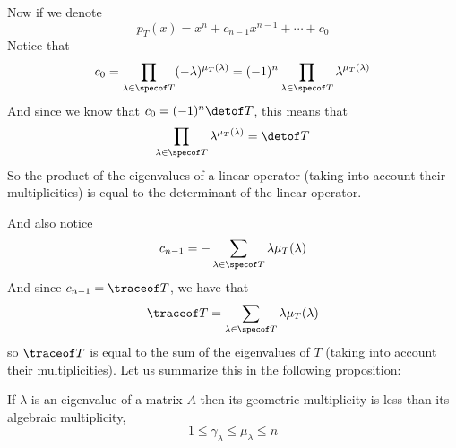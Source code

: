 Now if we denote
\[ p_T(x) = x^n + c_{n-1}x^{n-1} + \cdots + c_0 \]
Notice that
\[ c_0 = \prod_{\lambda\in\specof T}(-\lambda)^{\mu_T(\lambda)} = (-1)^n\prod_{\lambda\in\specof T}\lambda^{\mu_T(\lambda)} \]
And since we know that $c_0=(-1)^n\detof T$, this means that
\[ \prod_{\lambda\in\specof T}\lambda^{\mu_T(\lambda)} = \detof T \]
So the product of the eigenvalues of a linear operator (taking into account their multiplicities) is equal to the determinant of the linear operator.

And also notice
\[ c_{n-1} = -\sum_{\lambda\in\specof T}\lambda\mu_T(\lambda) \]
And since $c_{n-1}=\traceof T$, we have that
\[ \traceof T = \sum_{\lambda\in\specof T}\lambda\mu_T(\lambda) \]
so $\traceof T$ is equal to the sum of the eigenvalues of $T$ (taking into account their multiplicities).
Let us summarize this in the following proposition:

\begin{thrm*}

    If $\lambda$ is an eigenvalue of a matrix $A$ then its geometric multiplicity is less than its algebraic multiplicity,
    \[ 1\leq\gamma_\lambda\leq\mu_\lambda\leq n \]

\end{thrm*}

